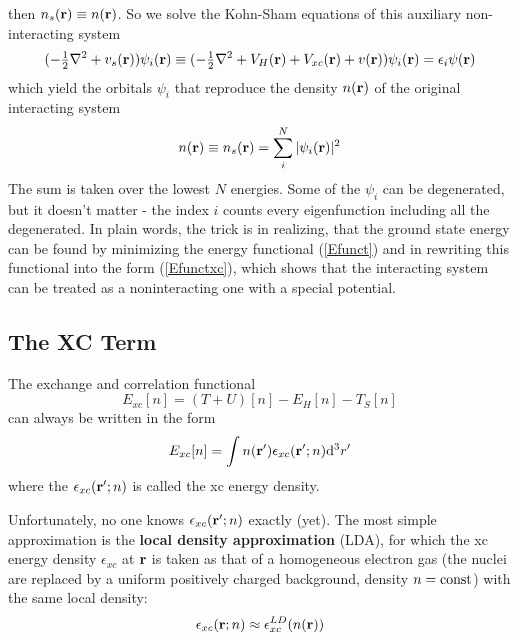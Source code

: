 then $n_s({\bf r})\equiv n({\bf r})$. So we solve the Kohn-Sham equations of this auxiliary non-interacting system 
\begin{equation}
  (-{\textstyle{1\over2}}\nabla^2+v_s({\bf r}))\psi_i({\bf r}) \equiv(-{\textstyle{1\over2}}\nabla^2+V_H({\bf r})+V_{xc}({\bf r})+v({\bf r}))\psi_i({\bf r}) =\epsilon_i\psi({\bf r})  \label{KSeq}
\end{equation}
which yield the orbitals $\psi_i$ that reproduce the density $n({\bf r})$ of the original interacting system 
\begin{equation}
  n({\bf r})\equiv n_s({\bf r})=\sum_i^N|\psi_i({\bf r})|^2  \label{KSdensity}
\end{equation}
The sum is taken over the lowest $N$ energies. Some of the $\psi_i$ can be degenerated, but it doesn't matter - the index $i$ counts every eigenfunction including all the degenerated. In plain words, the trick is in realizing, that the ground state energy can be found by minimizing the energy functional (\ref{Efunct}) and in rewriting this functional into the form (\ref{Efunctxc}), which shows that the interacting system can be treated as a noninteracting one with a special potential.

\subsection{The XC Term}

The exchange and correlation functional 
\begin{equation*}
  E_{xc}[n]=(T+U)[n]-E_H[n]-T_S[n]
\end{equation*}
can always be written in the form 
\begin{equation*}
  E_{xc}[n]=\int n({\bf r}')\epsilon_{xc}({\bf r}';n){\rm d}^3r'
\end{equation*}
where the $\epsilon_{xc}({\bf r}';n)$ is called the xc energy density.

Unfortunately, no one knows $\epsilon_{xc}({\bf r}';n)$ exactly (yet). The most simple approximation is the \textbf{local density approximation} (LDA), for which the xc energy density $\epsilon_{xc}$ at $\bf r$ is taken as that of a homogeneous electron gas (the nuclei are replaced by a uniform positively charged background, density $n=\rm const$) with the same local density: 
\begin{equation*}
  \epsilon_{xc}({\bf r};n)\approx\epsilon_{xc}^{LD}(n({\bf r}))
\end{equation*}

